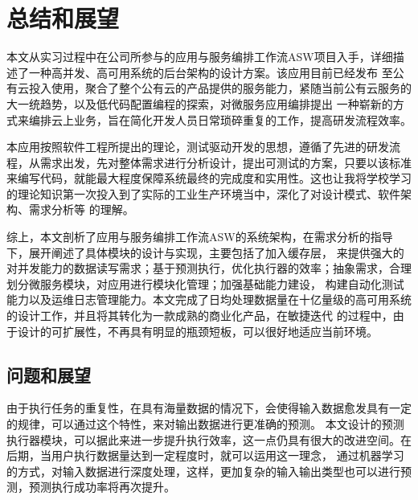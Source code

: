 
\chapter{总结和展望}
本文从实习过程中在公司所参与的应用与服务编排工作流ASW项目入手，详细描述了一种高并发、高可用系统的后台架构的设计方案。该应用目前已经发布
至公有云投入使用，聚合了整个公有云的产品提供的服务能力，紧随当前公有云服务的大一统趋势，以及低代码配置编程的探索，对微服务应用编排提出
一种崭新的方式来编排云上业务，旨在简化开发人员日常琐碎重复的工作，提高研发流程效率。

本应用按照软件工程所提出的理论，测试驱动开发的思想，遵循了先进的研发流程，从需求出发，先对整体需求进行分析设计，提出可测试的方案，只要以该标准
来编写代码，就能最大程度保障系统最终的完成度和实用性。这也让我将学校学习的理论知识第一次投入到了实际的工业生产环境当中，深化了对设计模式、软件架构、需求分析等
的理解。

综上，本文剖析了应用与服务编排工作流ASW的系统架构，在需求分析的指导下，展开阐述了具体模块的设计与实现，主要包括了加入缓存层，
来提供强大的对并发能力的数据读写需求；基于预测执行，优化执行器的效率；抽象需求，合理划分微服务模块，对应用进行模块化管理；加强基础能力建设，
构建自动化测试能力以及运维日志管理能力。本文完成了日均处理数据量在十亿量级的高可用系统的设计工作，并且将其转化为一款成熟的商业化产品，在敏捷迭代
的过程中，由于设计的可扩展性，不再具有明显的瓶颈短板，可以很好地适应当前环境。



\section{问题和展望}

由于执行任务的重复性，在具有海量数据的情况下，会使得输入数据愈发具有一定的规律，可以通过这个特性，来对输出数据进行更准确的预测。
本文设计的预测执行器模块，可以据此来进一步提升执行效率，这一点仍具有很大的改进空间。在后期，当用户执行数据量达到一定程度时，就可以运用这一理念，
通过机器学习的方式，对输入数据进行深度处理，这样，更加复杂的输入输出类型也可以进行预测，预测执行成功率将再次提升。